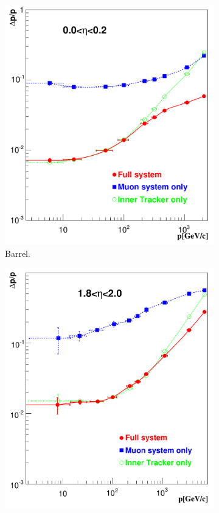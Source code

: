 \begin{figure}[htbp]
  \centering
  \begin{subfigure}{0.48\textwidth}
    \centering
    \includegraphics[width=\textwidth]{muon_barrel}
    \caption{Barrel.}
    \label{fig:met_res}
  \end{subfigure}
  \begin{subfigure}{0.48\textwidth}
    \centering
    \includegraphics[width=\textwidth]{muon_endcap}

\end{subfigure}
\end{figure}
